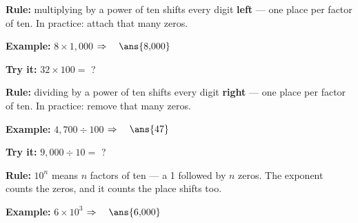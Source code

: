 \documentclass[12pt]{article}
\begin{document}


\begin{formulabox}
\textbf{Rule:} multiplying by a power of ten shifts every digit \textbf{left} —
one place per factor of ten. In practice: attach that many zeros.
\end{formulabox}

\begin{examplebox}
\textbf{Example:} \quad $8 \times 1{,}000$
$\Rightarrow\quad \ans{8{,}000}$
\end{examplebox}

\begin{tryitbox}
\textbf{Try it:} \quad $32 \times 100 = $ ?\\[2pt]
\end{tryitbox}


\begin{formulabox}
\textbf{Rule:} dividing by a power of ten shifts every digit \textbf{right} —
one place per factor of ten. In practice: remove that many zeros.
\end{formulabox}

\begin{examplebox}
\textbf{Example:} \quad $4{,}700 \div 100$
$\Rightarrow\quad \ans{47}$
\end{examplebox}

\begin{tryitbox}
\textbf{Try it:} \quad $9{,}000 \div 10 = $ ?\\[2pt]
\end{tryitbox}


\begin{formulabox}
\textbf{Rule:} $10^n$ means $n$ factors of ten — a 1 followed by $n$ zeros.
The exponent counts the zeros, and it counts the place shifts too.
\end{formulabox}

\begin{examplebox}
\textbf{Example:} \quad $6 \times 10^3$
$\Rightarrow\quad \ans{6{,}000}$
\end{examplebox}
\end{document}
